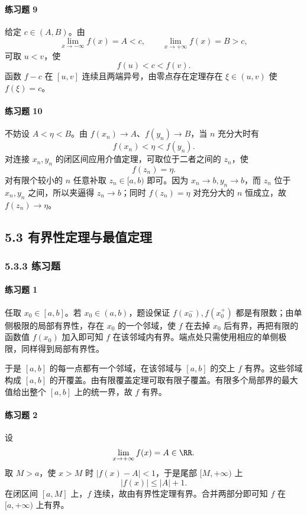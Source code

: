\paragraph{练习题 9}
\begin{xsolution}
给定 $c\in(A,B)$。由
\[
 \lim_{x\to-\infty}f(x)=A<c,
 \qquad
 \lim_{x\to+\infty}f(x)=B>c,
\]
可取 $u<v$，使
\[
 f(u)<c<f(v).
\]
函数 $f-c$ 在 $[u,v]$ 连续且两端异号，由零点存在定理存在 $\xi\in(u,v)$ 使 $f(\xi)=c$。
\end{xsolution}

\paragraph{练习题 10}
\begin{xsolution}
不妨设 $A<\eta<B$。由 $f(x_n)\to A$、$f(y_n)\to B$，当 $n$ 充分大时有
\[
 f(x_n)<\eta<f(y_n).
\]
对连接 $x_n,y_n$ 的闭区间应用介值定理，可取位于二者之间的 $z_n$，使
\[
 f(z_n)=\eta.
\]
对有限个较小的 $n$ 任意补取 $z_n\in[a,b)$ 即可。因为 $x_n\to b,y_n\to b$，而 $z_n$ 位于 $x_n,y_n$ 之间，所以夹逼得 $z_n\to b$；同时 $f(z_n)=\eta$ 对充分大的 $n$ 恒成立，故 $f(z_n)\to\eta$。
\end{xsolution}

\subsection*{5.3 有界性定理与最值定理}

\subsubsection*{5.3.3 练习题}

\paragraph{练习题 1}
\begin{xsolution}
任取 $x_0\in[a,b]$。若 $x_0\in(a,b)$，题设保证 $f(x_0^-),f(x_0^+)$ 都是有限数；由单侧极限的局部有界性，存在 $x_0$ 的一个邻域，使 $f$ 在去掉 $x_0$ 后有界，再把有限的函数值 $f(x_0)$ 加入即可知 $f$ 在该邻域内有界。端点处只需使用相应的单侧极限，同样得到局部有界性。

于是 $[a,b]$ 的每一点都有一个邻域，在该邻域与 $[a,b]$ 的交上 $f$ 有界。这些邻域构成 $[a,b]$ 的开覆盖。由有限覆盖定理可取有限子覆盖。有限多个局部界的最大值给出整个 $[a,b]$ 上的统一界，故 $f$ 有界。
\end{xsolution}

\paragraph{练习题 2}
\begin{xsolution}
设
\[
 \lim_{x\to+\infty}f(x)=A\in\RR.
\]
取 $M>a$，使 $x>M$ 时 $|f(x)-A|<1$，于是尾部 $[M,+\infty)$ 上
\[
 |f(x)|\le |A|+1.
\]
在闭区间 $[a,M]$ 上，$f$ 连续，故由有界性定理有界。合并两部分即可知 $f$ 在 $[a,+\infty)$ 上有界。
\end{xsolution}

